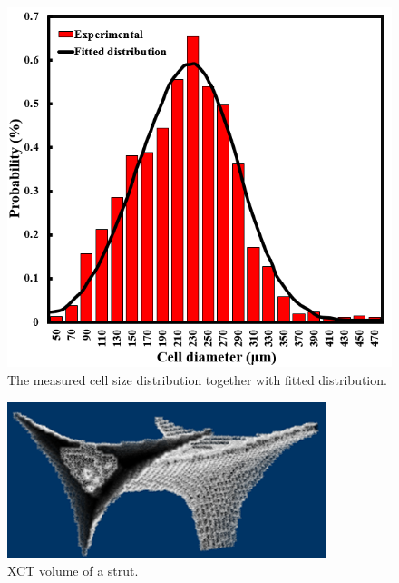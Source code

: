 \documentclass[review]{elsarticle}
\begin{document}
\begin{figure}[hb]
  \centering
  \includegraphics[scale=0.8]{CellSizeDist}
  \captionsetup{justification=centering}
  \caption[Close up of \textit{Hemidactylus} sp. ]
   {The measured cell size distribution together with fitted distribution.}
   \label{fig:CellSizeDist}
\end{figure}

\begin{figure}[hb]
  \centering
  \includegraphics[scale=1]{StrutShape}
  \captionsetup{justification=centering}
  \caption[Close up of \textit{Hemidactylus} sp. ]
   {XCT volume of a strut.}
   \label{fig:StrutShape}
\end{figure}
\end{document}
